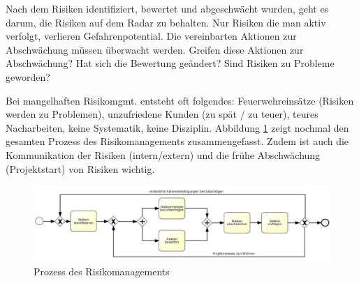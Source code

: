 Nach dem Risiken identifiziert, bewertet und abgeschwächt wurden, geht es darum, die Risiken auf dem Radar zu behalten. Nur Risiken die man aktiv verfolgt, verlieren Gefahrenpotential. Die vereinbarten Aktionen zur Abschwächung müssen überwacht werden. Greifen diese Aktionen zur Abschwächung? Hat sich die Bewertung geändert? Sind Risiken zu Probleme geworden? 

Bei mangelhaften Risikomgmt. entsteht oft folgendes: Feuerwehreinsätze (Risiken werden zu Problemen), unzufriedene Kunden (zu spät / zu teuer), teures Nacharbeiten, keine Systematik, keine Disziplin.
Abbildung \ref{fig:risiko-management-prozess} zeigt nochmal den gesamten Prozess des Risikomanagements zusammengefasst. Zudem ist auch die Kommunikation der Risiken (intern/extern) und die frühe Abschwächung (Projektstart) von Risiken wichtig.

\begin{figure}
\centering
\includegraphics[width=0.7\linewidth]{fig/risiko-management-prozess}
\caption{Prozess des Risikomanagements}
\label{fig:risiko-management-prozess}
\end{figure}
 